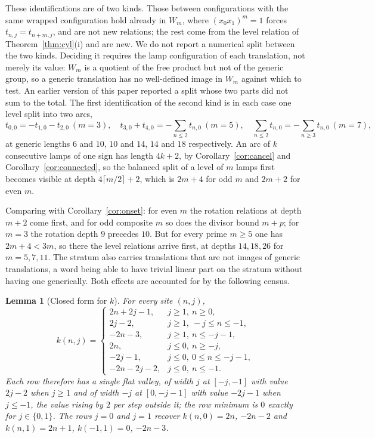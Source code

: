 \documentclass[11pt]{article}
\newtheorem{lemma}[theorem]{Lemma}
\theoremstyle{definition}
\theoremstyle{remark}
\begin{document}
These identifications are of two kinds. Those between configurations with the
same wrapped configuration hold already in $W_m$, where $(x_0x_1)^m=1$ forces
$t_{n,j}=t_{n+m,j}$, and are not new relations; the rest come from the level
relation of Theorem~\ref{thm:cyl}(i) and are new. We do not report a numerical
split between the two kinds. Deciding it requires the lamp configuration of each
translation, not merely its value: $W_m$ is a quotient of the free product but
not of the generic group, so a generic translation has no well-defined image in
$W_m$ against which to test. An earlier version of this paper reported a split
whose two parts did not sum to the total. The first identification of the second
kind is in each
case one level split into two arcs,
\[
 t_{0,0}=-t_{1,0}-t_{2,0}\ (m=3),\quad
 t_{3,0}+t_{4,0}=-\!\!\sum_{n\le2}\!t_{n,0}\ (m=5),\quad
 \sum_{n\le2}t_{n,0}=-\!\!\sum_{n\ge3}\!t_{n,0}\ (m=7),
\]
at generic lengths $6$ and $10$, $10$ and $14$, $14$ and $18$ respectively. An
arc of $k$ consecutive lamps of one sign has length $4k+2$, by
Corollary~\ref{cor:cancel} and Corollary~\ref{cor:connected}, so the balanced
split of a level of $m$ lamps first becomes visible at depth
$4\lceil m/2\rceil+2$, which is $2m+4$ for odd $m$ and $2m+2$ for even $m$.

Comparing with Corollary~\ref{cor:onset}: for even $m$ the rotation relations
at depth $m+2$ come first, and for odd composite $m$ so does the divisor bound
$m+p$; for $m=3$ the rotation depth $9$ precedes $10$. But for every prime
$m\ge5$ one has $2m+4<3m$, so there the level relations arrive first, at
depths $14,18,26$ for $m=5,7,11$. The stratum also carries translations that
are not images of generic translations, a word being able to have trivial
linear part on the stratum without having one generically. Both effects are
accounted for by the following census.

\begin{lemma}[Closed form for $k$]\label{lem:krows}
For every site $(n,j)$,
\[
  k(n,j)=
  \begin{cases}
    2n+2j-1, & j\ge1,\ n\ge0,\\
    2j-2,    & j\ge1,\ -j\le n\le-1,\\
    -2n-3,   & j\ge1,\ n\le-j-1,\\[2pt]
    2n,        & j\le0,\ n\ge-j,\\
    -2j-1,     & j\le0,\ 0\le n\le-j-1,\\
    -2n-2j-2,  & j\le0,\ n\le-1.
  \end{cases}
\]
Each row therefore has a single flat valley, of width $j$ at $[-j,-1]$ with value $2j-2$ when
$j\ge1$ and of width $-j$ at $[0,-j-1]$ with value $-2j-1$ when $j\le-1$, the value rising by
$2$ per step outside it; the row minimum is $0$ exactly for $j\in\{0,1\}$. The rows $j=0$ and
$j=1$ recover $k(n,0)=2n$, $-2n-2$ and $k(n,1)=2n+1$, $k(-1,1)=0$, $-2n-3$.
\end{lemma}
\end{document}
